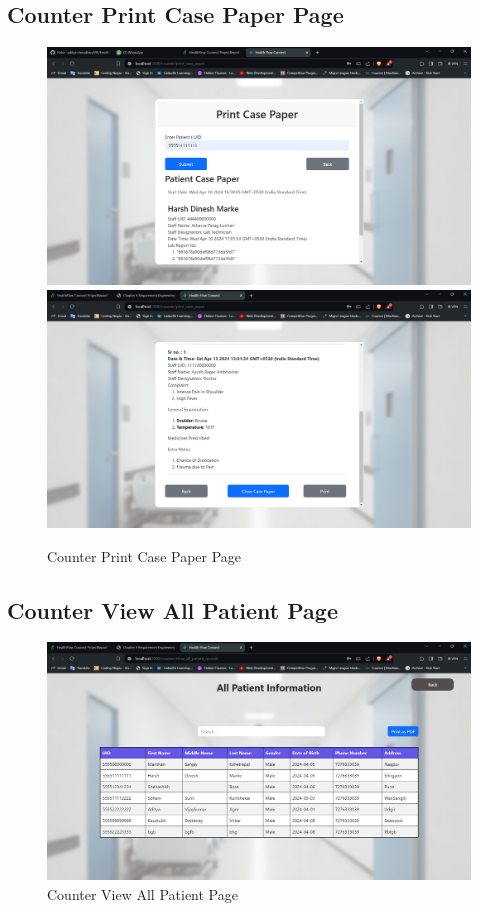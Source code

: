 \subsection{Counter Print Case Paper Page}
\begin{figure}[h!]
    \centering
    \includegraphics[width=\textwidth]{Counter_Print_Case_Paper.png}
    \includegraphics[width=\textwidth]{1.png}
    \caption{Counter Print Case Paper Page}
\end{figure}
\clearpage
\subsection{Counter View All Patient Page}
\begin{figure}[h!]
    \centering
    \includegraphics[width=\textwidth]{Counter_All_Patient_Records.png}
    \caption{Counter View All Patient Page}
\end{figure}
\clearpage
